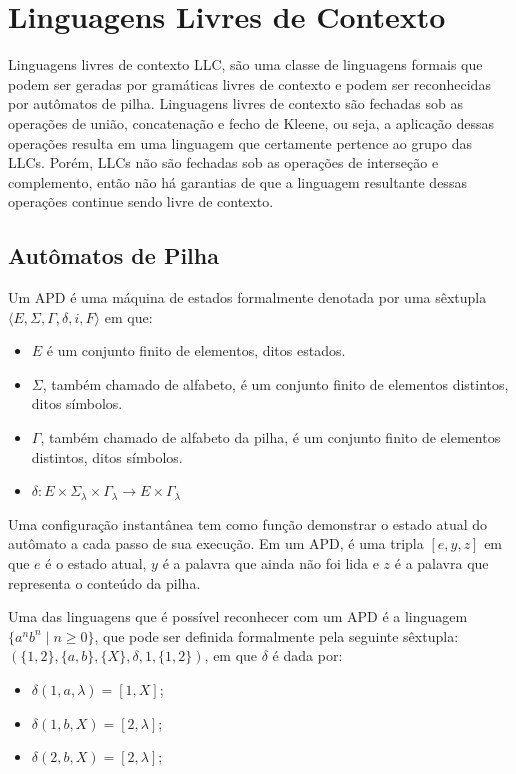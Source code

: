 \section{Linguagens Livres de Contexto}

Linguagens livres de contexto \ac{LLC}, são uma classe de linguagens formais que podem ser geradas por gramáticas livres de contexto e podem ser reconhecidas por autômatos de pilha. Linguagens livres de contexto são fechadas sob as operações de união, concatenação e fecho de Kleene, ou seja, a aplicação dessas operações resulta em uma linguagem que certamente pertence ao grupo das LLCs. Porém, LLCs não são fechadas sob as operações de interseção e complemento, então não há garantias de que a linguagem resultante dessas operações continue sendo livre de contexto.

\subsection{Autômatos de Pilha}

Um \ac{APD} é uma máquina de estados formalmente denotada por uma sêxtupla $\langle E,\Sigma, \Gamma, \delta,i,F\rangle$ em que:

\begin{itemize}
     \item $E$ é um conjunto finito de elementos, ditos estados.
     \item $\Sigma$, também chamado de alfabeto, é um conjunto finito de elementos distintos, ditos símbolos.
     \item $\Gamma$, também chamado de alfabeto da pilha, é um conjunto finito de elementos distintos, ditos símbolos.
     \item $\delta : E \times \Sigma_\lambda \times \Gamma_\lambda \to E \times \Gamma_\lambda$
\end{itemize}

Uma configuração instantânea tem como função demonstrar o estado atual do autômato a cada passo de sua execução. Em um APD, é uma tripla $[e,y,z]$ em que $e$ é o estado atual, $y$ é a palavra que ainda não foi lida e $z$ é a palavra que representa o conteúdo da pilha.

Uma das linguagens que é possível reconhecer com um APD é a linguagem $\{a^n b^n \mid n \geq 0\}$, que pode ser definida formalmente pela seguinte sêxtupla: $(\{1,2\},\{a,b\},\{X\},\delta,1,\{1,2\})$, em que $\delta$ é dada por:

\begin{itemize}
    \item[] $\delta(1, a, \lambda) = [1, X]$;
    \item[] $\delta(1, b, X) = [2, \lambda]$;
    \item[] $\delta(2, b, X) = [2, \lambda]$;
\end{itemize}


